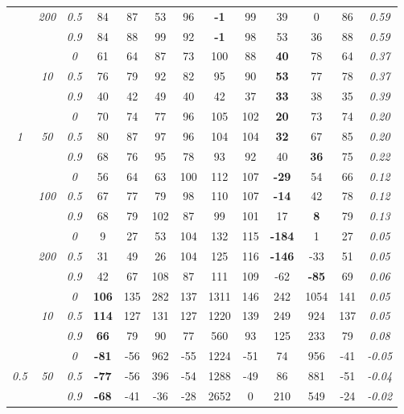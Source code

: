 \begin{table}
\begin{center}
\begin{tabular}{ccc|cc|cc|cc|cc|c|c}
 & \it  200  & \it  0.5  & 84 & 87 & 53 & 96 & {\bf -1} & 99 & 39 & 0 & 86 & \it  0.59 \\
& & \it  0.9  & 84 & 88 & 99 & 92 & {\bf -1} & 98 & 53 & 36 & 88 & \it  0.59 \\
\hline\rule{0pt}{3ex}
& & \it  0  & 61 & 64 & 87 & 73 & 100 & 88 & {\bf 40} & 78 & 64 & \it  0.37 \\
 & \it  10  & \it  0.5  & 76 & 79 & 92 & 82 & 95 & 90 & {\bf 53} & 77 & 78 & \it  0.37 \\
& & \it  0.9  & 40 & 42 & 49 & 40 & 42 & 37 & {\bf 33} & 38 & 35 & \it  0.39 \\[1ex]
\cline{2-3}\rule{0pt}{3ex}
& & \it  0  & 70 & 74 & 77 & 96 & 105 & 102 & {\bf 20} & 73 & 74 & \it  0.20 \\
\it  1  & \it  50  & \it  0.5  & 80 & 87 & 97 & 96 & 104 & 104 & {\bf 32} & 67 & 85 & \it  0.20 \\
& & \it  0.9  & 68 & 76 & 95 & 78 & 93 & 92 & 40 & {\bf 36} & 75 & \it  0.22 \\[1ex]
\cline{2-3}\rule{0pt}{3ex}
& & \it  0  & 56 & 64 & 63 & 100 & 112 & 107 & {\bf -29} & 54 & 66 & \it  0.12 \\
 & \it  100  & \it  0.5  & 67 & 77 & 79 & 98 & 110 & 107 & {\bf -14} & 42 & 78 & \it  0.12 \\
& & \it  0.9  & 68 & 79 & 102 & 87 & 99 & 101 & 17 & {\bf 8} & 79 & \it  0.13 \\[1ex]
\cline{2-3}\rule{0pt}{3ex}
& & \it  0  & 9 & 27 & 53 & 104 & 132 & 115 & {\bf -184} & 1 & 27 & \it  0.05 \\
 & \it  200  & \it  0.5  & 31 & 49 & 26 & 104 & 125 & 116 & {\bf -146} & -33 & 51 & \it  0.05 \\
& & \it  0.9  & 42 & 67 & 108 & 87 & 111 & 109 & -62 & {\bf -85} & 69 & \it  0.06 \\
\hline\rule{0pt}{3ex}
& & \it  0  & {\bf 106} & 135 & 282 & 137 & 1311 & 146 & 242 & 1054 & 141 & \it  0.05 \\
 & \it  10  & \it  0.5  & {\bf 114} & 127 & 131 & 127 & 1220 & 139 & 249 & 924 & 137 & \it  0.05 \\
& & \it  0.9  & {\bf 66} & 79 & 90 & 77 & 560 & 93 & 125 & 233 & 79 & \it  0.08 \\[1ex]
\cline{2-3}\rule{0pt}{3ex}
& & \it  0  & {\bf -81} & -56 & 962 & -55 & 1224 & -51 & 74 & 956 & -41 & \it  -0.05 \\
\it  0.5  & \it  50  & \it  0.5  & {\bf -77} & -56 & 396 & -54 & 1288 & -49 & 86 & 881 & -51 & \it  -0.04 \\
& & \it  0.9  & {\bf -68} & -41 & -36 & -28 & 2652 & 0 & 210 & 549 & -24 & \it  -0.02 \\[1ex]

\end{tabular}
\end{center}
\end{table}
